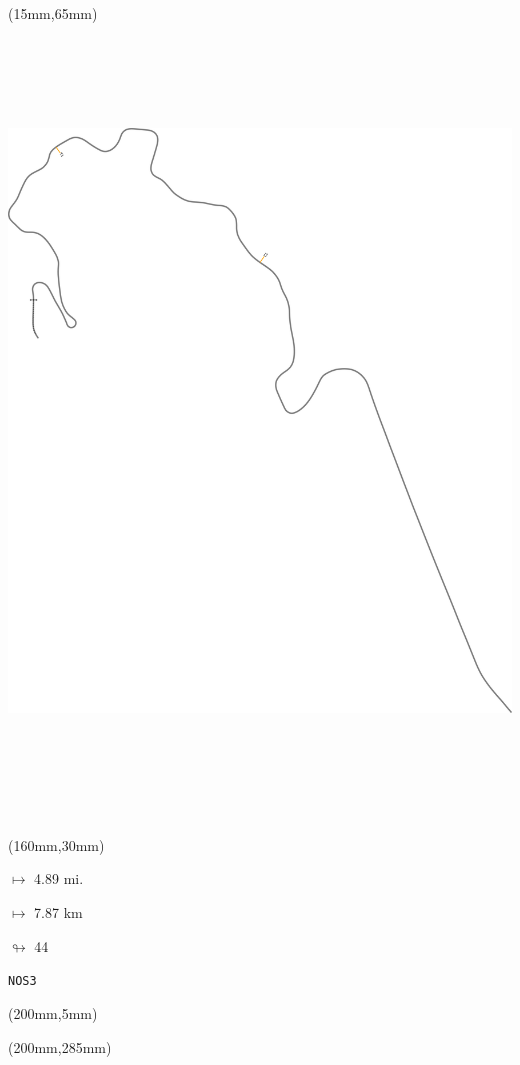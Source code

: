 \begin{textblock*}{185mm}(15mm,65mm)%
\centering
\mbox{\includegraphics[width=185mm,height=210mm,keepaspectratio]{PT/NOS3.pdf}}
\end{textblock*}
\begin{textblock*}{40mm}(160mm,30mm)%
\Large
\par$\mapsto$ 4.89 mi.
\par$\mapsto$ 7.87 km
\par$\looparrowright$ 44
\par\hfill\tiny\tt NOS3\\
\end{textblock*}
\begin{textblock*}{20mm}(200mm,5mm)%
\fbox{\thepage}
\label{NOS3}
\end{textblock*}
\begin{textblock*}{20mm}(200mm,285mm)%
\fbox{\thepage}
\end{textblock*}

